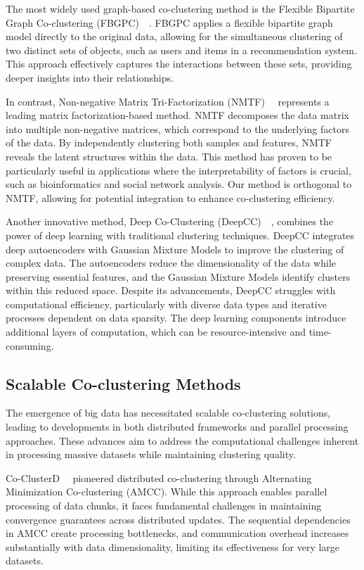 \documentclass[journal]{IEEEtran}
\renewcommand{\cite}[1]{~\autocite{#1}}
\begin{document}
The most widely used graph-based co-clustering method is the Flexible Bipartite Graph Co-clustering (FBGPC)~\cite{chen2023FastFlexibleBipartitea}. FBGPC applies a flexible bipartite graph model directly to the original data, allowing for the simultaneous clustering of two distinct sets of objects, such as users and items in a recommendation system. This approach effectively captures the interactions between these sets, providing deeper insights into their relationships.

In contrast, Non-negative Matrix Tri-Factorization (NMTF)~\cite{long2005CoclusteringBlockValue} represents a leading matrix factorization-based method. NMTF decomposes the data matrix into multiple non-negative matrices, which correspond to the underlying factors of the data. By independently clustering both samples and features, NMTF reveals the latent structures within the data. This method has proven to be particularly useful in applications where the interpretability of factors is crucial, such as bioinformatics and social network analysis. Our method is orthogonal to NMTF, allowing for potential integration to enhance co-clustering efficiency.

Another innovative method, Deep Co-Clustering (DeepCC)~\cite{dongkuanxu2019DeepCoClustering}, combines the power of deep learning with traditional clustering techniques. DeepCC integrates deep autoencoders with Gaussian Mixture Models to improve the clustering of complex data. The autoencoders reduce the dimensionality of the data while preserving essential features, and the Gaussian Mixture Models identify clusters within this reduced space. Despite its advancements, DeepCC struggles with computational efficiency, particularly with diverse data types and iterative processes dependent on data sparsity. The deep learning components introduce additional layers of computation, which can be resource-intensive and time-consuming.

\subsection{Scalable Co-clustering Methods}
The emergence of big data has necessitated scalable co-clustering solutions, leading to developments in both distributed frameworks and parallel processing approaches. These advances aim to address the computational challenges inherent in processing massive datasets while maintaining clustering quality.

Co-ClusterD~\cite{cheng2015CoClusterDDistributedFramework} pioneered distributed co-clustering through Alternating Minimization Co-clustering (AMCC). While this approach enables parallel processing of data chunks, it faces fundamental challenges in maintaining convergence guarantees across distributed updates. The sequential dependencies in AMCC create processing bottlenecks, and communication overhead increases substantially with data dimensionality, limiting its effectiveness for very large datasets.
\end{document}
